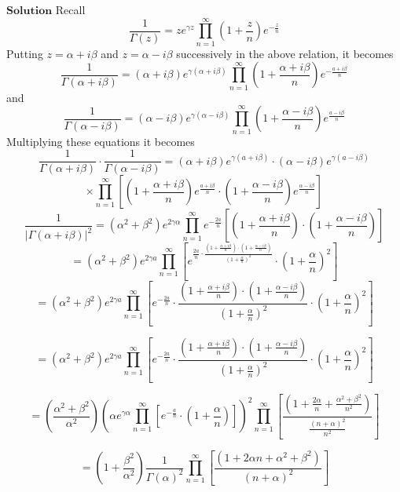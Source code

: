 \documentclass{article}
\begin{document}
\begin{flushleft}
$\boxed{\textbf{Solution}}$ Recall 
$$
\frac{1}{\Gamma(z)}=z e^{\gamma z} \prod_{n=1}^{\infty}\left(1+\frac{z}{n}\right) e^{-\frac{z}{n}}
$$
Putting $z=\alpha+i \beta$ and $z=\alpha-i \beta$ successively in the above relation, it becomes
$$
\frac{1}{\Gamma(\alpha+i \beta)}=(\alpha+i \beta) e^{\gamma(\alpha+i \beta)} \prod_{n=1}^{\infty}\left(1+\frac{\alpha+i \beta}{n}\right) e^{-\frac{a+i \beta}{n}}
$$
and 
$$
\frac{1}{\Gamma(\alpha-i \beta)}=(\alpha-i \beta) e^{\gamma(\alpha-i \beta)} \prod_{n=1}^{\infty}\left(1+\frac{\alpha-i \beta}{n}\right) e^{\frac{a-i \beta}{n}}
$$
Multiplying these equations it becomes
$$
\frac{1}{\Gamma(\alpha+i \beta)} \cdot \frac{1}{\Gamma(\alpha-i \beta)}=(\alpha+i \beta) e^{\gamma(a+i \beta)} \cdot(\alpha-i \beta) e^{\gamma(a-i \beta)}$$
$$\times \prod_{n=1}^{\infty}\left[\left(1+\frac{\alpha+i \beta}{n}\right) e^{\frac{a+i \beta}{n}} \cdot\left(1+\frac{\alpha-i \beta}{n}\right) e^{\frac{\alpha-i \beta}{n}}\right]
$$
$$
\frac{1}{|\Gamma(\alpha+i \beta)|^{2}}=\left(\alpha^{2}+\beta^{2}\right) e^{2\gamma \alpha} \prod_{n=1}^{\infty} e^{-\frac{2 a}{n}}\left[\left(1+\frac{\alpha+i \beta}{n}\right) \cdot\left(1+\frac{\alpha-i \beta}{n}\right)\right]
$$
$$
=\left(\alpha^{2}+\beta^{2}\right) e^{2 \gamma a} \prod_{n=1}^{\infty}\left[e^{\frac{2 a}{n} \cdot \frac{\left(1+\frac{\alpha+i \beta}{n}\right) \cdot\left(1+\frac{\alpha-i \beta}{n}\right)}{\left(1+\frac{\alpha}{n}\right)^{2}}} \cdot\left(1+\frac{\alpha}{n}\right)^{2}\right]
$$
$$
=\left(\alpha^{2}+\beta^{2}\right) e^{2 \gamma a} \prod_{n=1}^{\infty}\left[e^{-\frac{2 a}{n}} \cdot \frac{\left(1+\frac{\alpha+i \beta}{n}\right) \cdot\left(1+\frac{\alpha-i \beta}{n}\right)}{\left(1+\frac{\alpha}{n}\right)^{2}} \cdot\left(1+\frac{\alpha}{n}\right)^{2}\right]
$$

$$
=\left(\alpha^{2}+\beta^{2}\right) e^{2 \gamma a} \prod_{n=1}^{\infty}\left[e^{-\frac{2 a}{n}} \cdot \frac{\left(1+\frac{\alpha+i \beta}{n}\right) \cdot\left(1+\frac{\alpha-i \beta}{n}\right)}{\left(1+\frac{\alpha}{n}\right)^{2}} \cdot\left(1+\frac{\alpha}{n}\right)^{2}\right]
$$

$$
=\left(\frac{\alpha^{2}+\beta^{2}}{\alpha^{2}}\right)\left(\alpha e^{\gamma \alpha} \prod_{n=1}^{\infty}\left[e^{-\frac{a}{n}} \cdot\left(1+\frac{\alpha}{n}\right)\right]\right)^{2} \prod_{n=1}^{\infty}\left[\frac{\left(1+\frac{2 \alpha}{n}+\frac{\alpha^{2}+\beta^{2}}{n^{2}}\right)}{\frac{(n+\alpha)^{2}}{n^{2}}}\right]
$$


$$
=\left(1+\frac{\beta^{2}}{\alpha^{2}}\right) \frac{1}{\Gamma(\alpha)^{2}} \prod_{n=1}^{\infty}\left[\frac{\left(1+2 \alpha n+\alpha^{2}+\beta^{2}\right)}{(n+\alpha)^{2}}\right]
$$


\end{flushleft}
\end{document}

